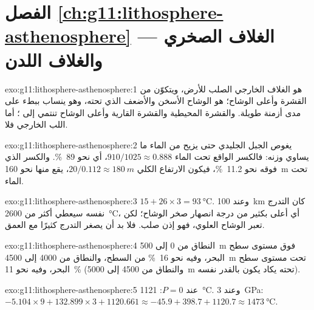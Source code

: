 \section*{الفصل \ref{ch:g11:lithosphere-asthenosphere} --- الغلاف الصخري والغلاف اللدن}

\begin{solution}{exo:g11:lithosphere-asthenosphere:1}
 هو الغلاف الخارجي الصلب للأرض، ويتكوّن من القشرة
وأعلى الوشاح؛  هو الوشاح الأسخن والأضعف الذي
تحته، وهو ينساب ببطء على مدى أزمنة طويلة. والقشرة المحيطية والقشرة
القارية وأعلى الوشاح تنتمي إلى ؛ أما اللب الخارجي
فلا.
\end{solution}

\begin{solution}{exo:g11:lithosphere-asthenosphere:2}
يغوص الجبل الجليدي حتى يزيح من الماء ما يساوي وزنه: فالكسر
الواقع تحت الماء $910/1025 \approx 0.888$، أي نحو \qty{89}{\percent}.
والكسر الذي فوقه نحو \qty{11.2}{\percent}، فيكون الارتفاع الكلي
$20/0.112 \approx \qty{180}{m}$، يقع منها نحو \qty{160}{m} تحت
الماء.
\end{solution}

\begin{solution}{exo:g11:lithosphere-asthenosphere:3}
$15 + 26 \times 3 = \qty{93}{\celsius}$. وعند \qty{100}{km} كان التدرج نفسه
سيعطي أكثر من \qty{2600}{\celsius}، أي أعلى بكثير من درجة انصهار
صخر الوشاح؛ لكن  تعبر الوشاح العلوي، فهو إذن صلب.
فلا بد أن يصغر التدرج كثيرًا مع العمق.
\end{solution}

\begin{solution}{exo:g11:lithosphere-asthenosphere:4}
النطاق من 0 إلى \qty{500}{m} فوق مستوى سطح البحر، وفيه نحو
\qty{16}{\percent} من السطح، والنطاق من 4000 إلى \qty{4500}{m}
تحت مستوى سطح البحر، وفيه نحو \qty{11}{\percent} (والنطاق من 4500 إلى
\qty{5000}{m} تحته يكاد يكون بالقدر نفسه).
\end{solution}

\begin{solution}{exo:g11:lithosphere-asthenosphere:5}
عند $P = 0$: \qty{1121}{\celsius}. وعند \qty{3}{GPa}: $-5.104 \times 9 +
132.899 \times 3 + 1120.661 \approx -45.9 + 398.7 + 1120.7 \approx
\qty{1473}{\celsius}$.
\end{solution}

